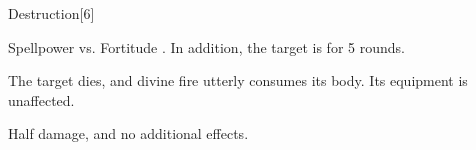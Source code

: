 \begin{spellsection}{Destruction}[6]
    \begin{spellheader}
    \end{spellheader}
    \begin{spellcontent}
        \begin{spelltargetinginfo}
        \end{spelltargetinginfo}
        \begin{spelleffects}
            \begin{spellattack}{Spellpower vs. Fortitude}
                \spellsuccess {}. In addition, the target is \staggered for 5 rounds.

                \spellcritical The target dies, and divine fire utterly consumes its body. Its equipment is unaffected.

                \spellfailure Half damage, and no additional effects.
            \end{spellattack}
        \end{spelleffects}
    \end{spellcontent}
    \begin{spellfooter}
        \miscastrandom
    \end{spellfooter}
\end{spellsection}

